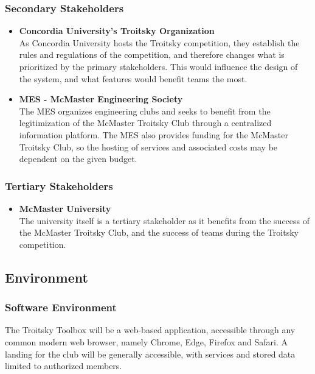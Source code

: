 \documentclass{article}
\begin{document}
\subsubsection{Secondary Stakeholders}

\begin{itemize}
    \item \textbf{Concordia University's Troitsky Organization}
    \\
 As Concordia University hosts the Troitsky competition, they establish the rules and regulations of the competition, 
and therefore changes what is prioritized by the primary stakeholders. This would influence the design of the system, 
and what features would benefit teams the most.
    \item \textbf{MES - McMaster Engineering Society}
    \\
 The MES organizes engineering clubs and seeks to benefit from the legitimization 
of the McMaster Troitsky Club through a centralized information platform. The MES also provides 
funding for the McMaster Troitsky Club, so the hosting of services and associated costs may be dependent on the given budget.
\end{itemize}

\subsubsection{Tertiary Stakeholders}

\begin{itemize}
    \item \textbf{McMaster University}
    \\
 The university itself is a tertiary stakeholder as it benefits from the success of the McMaster Troitsky Club, 
and the success of teams during the Troitsky competition.
\end{itemize}

\subsection{Environment}

\subsubsection{Software Environment}
The Troitsky Toolbox will be a web-based application, accessible through any common modern web browser,
namely Chrome, Edge, Firefox and Safari. A landing 
for the club will be generally accessible, with services and stored data limited to authorized members.
\end{document}
